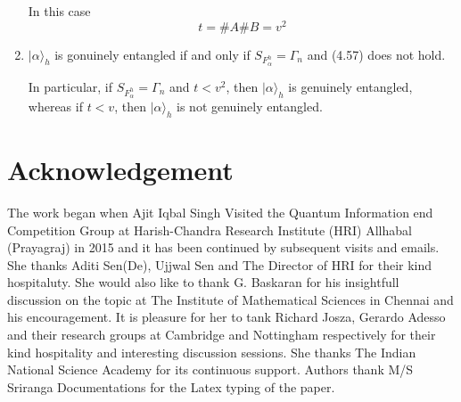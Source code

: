 \documentclass[a4paper,12pt]{article}
\theoremstyle{definition}
\theoremstyle{underlinethm}
\theoremstyle{definition}
\begin{document}
\begin{enumerate}[label=(\alph*)]
In this case
\begin{equation}
t = \# A \# B =v^{2} \tag{4.58}\label{eq-4.58}
\end{equation}

\item $| \alpha \rangle_{h}$ is gonuinely entangled if and only if $S_{F_{\alpha}^{h}} = \Gamma_{n}$ and (4.57) does not hold. 

In particular, if $S_{F_{\alpha}^{h}} = \Gamma_{n}$ and $t < v^{2}$, then $| \alpha \rangle_{h}$ is genuinely entangled, whereas if $t < v$, then $| \alpha \rangle_{h}$ is not genuinely entangled.
\end{enumerate}


\section{Acknowledgement}

The work began when Ajit Iqbal Singh Visited the Quantum Information end Competition Group at Harish-Chandra Research Institute (HRI) Allhabal (Prayagraj) in 2015 and it has been continued by subsequent visits and emails. She thanks Aditi Sen(De), Ujjwal Sen and The Director of HRI for their kind hospitaluty. She would also like to thank G. Baskaran for his insightfull discussion on the topic at The Institute of Mathematical Sciences in  Chennai and his encouragement. It is pleasure for her to tank Richard Josza, Gerardo Adesso and their research groups at Cambridge and Nottingham respectively for their kind hospitality and interesting discussion sessions. She thanks The Indian National Science Academy for its continuous support. Authors thank M/S Sriranga Documentations for the Latex typing of the paper. 
\end{document}
